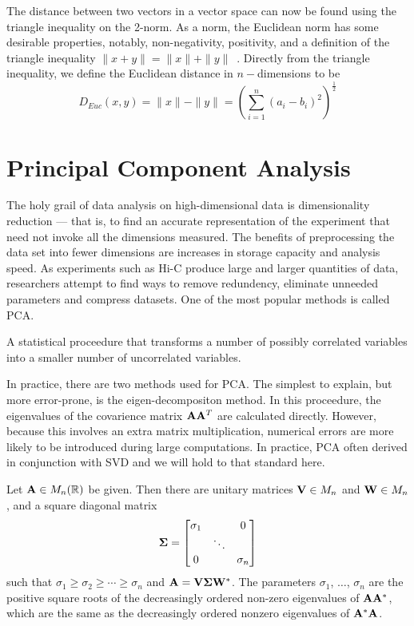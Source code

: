 The distance between two vectors in a vector space can now be found using the triangle inequality on the 2-norm.  As a norm, the Euclidean
norm has some desirable properties, notably, non-negativity, positivity, and a definition of the triangle inequality
$\|x + y\| = \|x\| + \|y\|$~\cite{horn2013}.  Directly from the triangle inequality, we define the Euclidean distance in $n-$dimensions to
be
\[
  D_{Euc}(x,y) = \|x\| - \|y\| = {(\sum_{i = 1}^{n}{(a_i - b_i)}^2)}^{\frac{1}{2}}
\]


\section*{Principal Component Analysis}

The holy grail of data analysis on high-dimensional data is dimensionality reduction --- that is, to find an accurate representation of
the experiment that need not invoke all the dimensions measured.  The benefits of preprocessing the data set into fewer dimensions are
increases in storage capacity and analysis speed.  As experiments such as Hi-C produce large and larger quantities of data, researchers
attempt to find ways to remove redundency, eliminate unneeded parameters and compress datasets.  One of the most popular methods is
called \gls{PCA}\cite{law1987}.

\begin{defn}
  A statistical proceedure that transforms a number of possibly correlated variables into a smaller number of uncorrelated variables.
\end{defn}

In practice, there are two methods used for \gls{PCA}.  The simplest to explain, but more error-prone, is the eigen-decompositon
method\cite{}.  In this proceedure, the eigenvalues of the covarience matrix $\mathbf{A}\mathbf{A}^T$ are calculated directly.  However,
because this involves an extra matrix multiplication, numerical errors are more likely to be introduced during large computations.
In practice, \gls{PCA} often derived in conjunction with \gls{SVD} and we will hold to that standard here.

\begin{thm}
  Let $\mathbf{A} \in M_{n}(\mathbb{R})$ be given. Then there are unitary matrices $\mathbf{V} \in M_n$ and $\mathbf{W} \in M_n$, and a square diagonal
  matrix
  \[
    \mathbf{\Sigma} =
      \begin{bmatrix}
        \sigma_1 &        & 0        \\
                 & \ddots &          \\
        0        &        & \sigma_n \\
      \end{bmatrix}
  \]
  such that $\sigma_1 \geq \sigma_2 \geq \cdots \geq \sigma_n$ and $\mathbf{A} = \mathbf{V}\mathbf{\Sigma}\mathbf{W}^*$.  The parameters $\sigma_1$,
  $\hdots$, $\sigma_n$ are the positive square roots of the decreasingly ordered non-zero eigenvalues of $\mathbf{A}\mathbf{A}^*$, which are the
  same as the decreasingly ordered nonzero eigenvalues of $\mathbf{A}^*\mathbf{A}$.

\end{thm}

